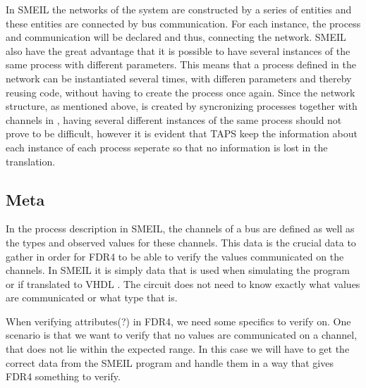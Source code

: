 In SMEIL the networks of the system are constructed by a series of entities and these entities are connected by bus communication. For each instance, the process and communication will be declared and thus, connecting the network. SMEIL also have the great advantage that it is possible to have several instances of the same process with different parameters. This means that a process defined in the network can be instantiated several times, with differen parameters and thereby reusing code, without having to create the process once again. Since the network structure, as mentioned above, is created by syncronizing processes together with channels in \cspm, having several different instances of the same process should not prove to be difficult, however it is evident that TAPS keep the information about each instance of each process seperate so that no information is lost in the translation.






\subsection{Meta}

In the process description in SMEIL, the channels of a bus are defined as well as the types and observed values for these channels. This data is the crucial data to gather in order for FDR4 to be able to verify the values communicated on the channels. In SMEIL it is simply data that is used when simulating the program or if translated to VHDL
. The circuit does not need to know exactly what values are communicated or what type that is.


When verifying attributes(?) in FDR4, we need some specifics to verify on. One scenario is that we want to verify that no values are communicated on a channel, that does not lie within the expected range. In this case we will have to get the correct data from the SMEIL program and handle them in a way that gives FDR4 something to verify.
